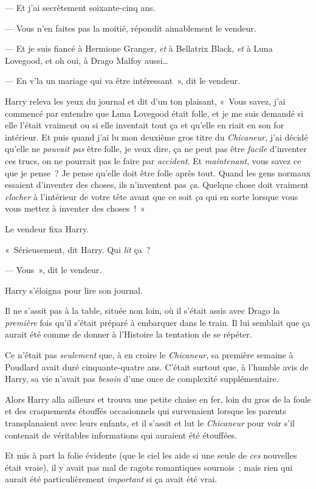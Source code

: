 --- Et j'ai secrètement soixante-cinq ans.

--- Vous n'en faites pas la moitié, répondit aimablement le vendeur.

--- Et je suis fiancé à Hermione Granger, \emph{et} à Bellatrix Black, \emph{et} à Luna Lovegood, et oh oui, à Drago Malfoy aussi…

--- En v'la un mariage qui va être intéressant~», dit le vendeur.

Harry releva les yeux du journal et dit d'un ton plaisant, «~Vous savez, j'ai commencé par entendre que Luna Lovegood était folle, et je me suis demandé si elle l'était vraiment ou si elle inventait tout ça et qu'elle en riait en son for intérieur.
Et puis quand j'ai lu mon deuxième gros titre du \emph{Chicaneur}, j'ai décidé qu'elle ne \emph{pouvait pas} être folle, je veux dire, ça ne peut pas être \emph{facile} d'inventer ces trucs, on ne pourrait pas le faire par \emph{accident}.
Et \emph{maintenant}, vous savez ce que je pense~?
Je pense qu'elle doit être folle après tout.
Quand les gens normaux essaient d'inventer des choses, ils n'inventent pas \emph{ça}.
Quelque chose doit vraiment \emph{clocher} à l'intérieur de votre tête avant que ce soit \emph{ça} qui en sorte lorsque vous vous mettez à inventer des choses~!~»

Le vendeur fixa Harry.

«~Sérieusement, dit Harry.
Qui \emph{lit} ça~?

--- Vous~», dit le vendeur.

Harry s'éloigna pour lire son journal.

Il ne s'assit pas à la table, située non loin, où il s'était assis avec Drago la \emph{première} fois qu'il s'était préparé à embarquer dans le train.
Il lui semblait que ça aurait été comme de donner à l'Histoire la tentation de se répéter.

Ce n'était pas \emph{seulement} que, à en croire le \emph{Chicaneur}, sa première semaine à Poudlard avait duré cinquante-quatre ans.
C'était surtout que, à l'humble avis de Harry, sa vie n'avait pas \emph{besoin} d'une once de complexité supplémentaire.

Alors Harry alla ailleurs et trouva une petite chaise en fer, loin du gros de la foule et des craquements étouffés occasionnels qui survenaient lorsque les parents transplanaient avec leurs enfants, et il s'assit et lut le \emph{Chicaneur} pour voir s'il contenait de véritables informations qui auraient été étouffées.

Et mis à part la folie évidente (que le ciel les aide si une seule de \emph{ces} nouvelles était vraie), il y avait pas mal de ragots romantiques sournois~; mais rien qui aurait été particulièrement \emph{important} si ça avait été vrai.

